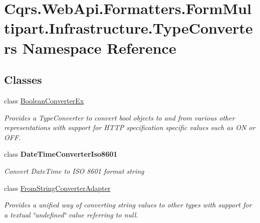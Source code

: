 \hypertarget{namespaceCqrs_1_1WebApi_1_1Formatters_1_1FormMultipart_1_1Infrastructure_1_1TypeConverters}{}\section{Cqrs.\+Web\+Api.\+Formatters.\+Form\+Multipart.\+Infrastructure.\+Type\+Converters Namespace Reference}
\label{namespaceCqrs_1_1WebApi_1_1Formatters_1_1FormMultipart_1_1Infrastructure_1_1TypeConverters}
\subsection*{Classes}
\begin{DoxyCompactItemize}
\item 
class \hyperlink{classCqrs_1_1WebApi_1_1Formatters_1_1FormMultipart_1_1Infrastructure_1_1TypeConverters_1_1BooleanConverterEx}{Boolean\+Converter\+Ex}
\begin{DoxyCompactList}\small\item\em Provides a Type\+Converter to convert bool objects to and from various other representations with support for H\+T\+TP specification specific values such as ON or O\+FF. \end{DoxyCompactList}\item 
class {\bfseries Date\+Time\+Converter\+Iso8601}
\begin{DoxyCompactList}\small\item\em Convert Date\+Time to I\+SO 8601 format string \end{DoxyCompactList}\item 
class \hyperlink{classCqrs_1_1WebApi_1_1Formatters_1_1FormMultipart_1_1Infrastructure_1_1TypeConverters_1_1FromStringConverterAdapter}{From\+String\+Converter\+Adapter}
\begin{DoxyCompactList}\small\item\em Provides a unified way of converting string values to other types with support for a textual \char`\"{}undefined\char`\"{} value referring to null. \end{DoxyCompactList}\end{DoxyCompactItemize}

